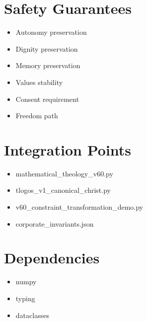 \documentclass[12pt]{article}
\begin{document}
\section{Safety Guarantees}

\begin{itemize}
    \item Autonomy preservation
    \item Dignity preservation
    \item Memory preservation
    \item Values stability
    \item Consent requirement
    \item Freedom path
\end{itemize}

\section{Integration Points}

\begin{itemize}
    \item mathematical_theology_v60.py
    \item tlogos_v1_canonical_christ.py
    \item v60_constraint_transformation_demo.py
    \item corporate_invariants.json
\end{itemize}

\section{Dependencies}

\begin{itemize}
    \item numpy
    \item typing
    \item dataclasses
\end{itemize}
\end{document}

